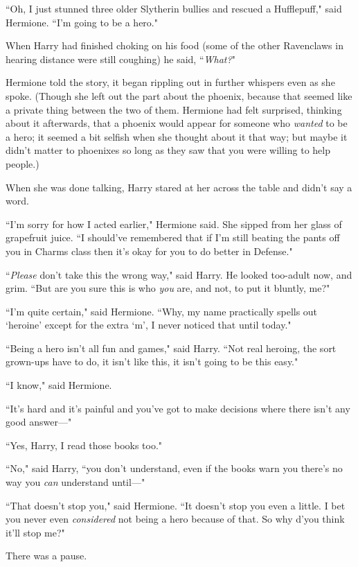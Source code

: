 ``Oh, I just stunned three older Slytherin bullies and rescued a Hufflepuff," said Hermione. ``I'm going to be a hero."

When Harry had finished choking on his food (some of the other Ravenclaws in hearing distance were still coughing) he said, ``\emph{What?}"

Hermione told the story, it began rippling out in further whispers even as she spoke. (Though she left out the part about the phoenix, because that seemed like a private thing between the two of them. Hermione had felt surprised, thinking about it afterwards, that a phoenix would appear for someone who \emph{wanted} to be a hero; it seemed a bit selfish when she thought about it that way; but maybe it didn't matter to phoenixes so long as they saw that you were willing to help people.)

When she was done talking, Harry stared at her across the table and didn't say a word.

``I'm sorry for how I acted earlier," Hermione said. She sipped from her glass of grapefruit juice. ``I should've remembered that if I'm still beating the pants off you in Charms class then it's okay for you to do better in Defense."

``\emph{Please} don't take this the wrong way," said Harry. He looked too-adult now, and grim. ``But are you sure this is who \emph{you} are, and not, to put it bluntly, me?"

``I'm quite certain," said Hermione. ``Why, my name practically spells out `heroine' except for the extra `m', I never noticed that until today."

``Being a hero isn't all fun and games," said Harry. ``Not real heroing, the sort grown-ups have to do, it isn't like this, it isn't going to be this easy."

``I know," said Hermione.

``It's hard and it's painful and you've got to make decisions where there isn't any good answer---"

``Yes, Harry, I read those books too."

``No," said Harry, ``you don't understand, even if the books warn you there's no way you \emph{can} understand until---"

``That doesn't stop you," said Hermione. ``It doesn't stop you even a little. I bet you never even \emph{considered} not being a hero because of that. So why d'you think it'll stop me?"

There was a pause.

